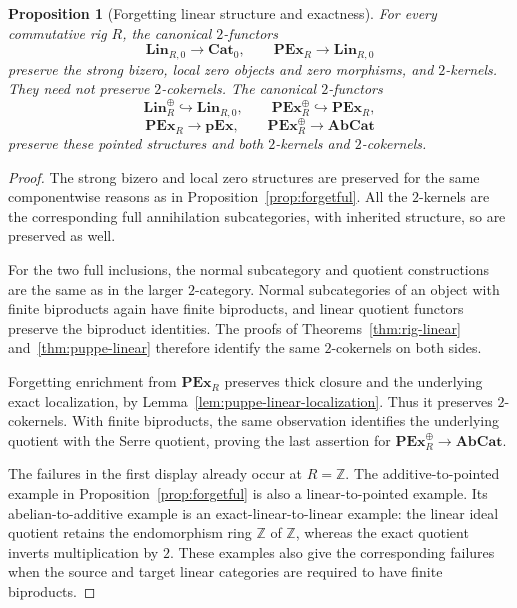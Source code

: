 \documentclass[11pt,reqno,a4paper]{amsart}
\newtheorem{proposition}[theorem]{Proposition}
\theoremstyle{definition}
\theoremstyle{remark}
\newcommand{\0}{\mathbf{0}}
\renewcommand{\1}{\mathbf{1}}
\newcommand{\AbCat}{\mathbf{AbCat}}
\newcommand{\pExact}{\mathbf{pEx}}
\newcommand{\Pt}{\mathbf{Cat}_{0}}
\begin{document}
\begin{proposition}[Forgetting linear structure and exactness]\label{prop:linear-forgetful}
For every commutative rig $R$, the canonical $2$-functors
\[
 \mathbf{Lin}_{R,0}\longrightarrow\Pt,
 \qquad
 \mathbf{PEx}_{R}\longrightarrow\mathbf{Lin}_{R,0}
\]
preserve the strong bizero, local zero objects and zero morphisms,
and $2$-kernels. They need not preserve $2$-cokernels.
The canonical $2$-functors
\[
 \mathbf{Lin}_{R}^{\oplus}\hookrightarrow\mathbf{Lin}_{R,0},
 \qquad
 \mathbf{PEx}_{R}^{\oplus}\hookrightarrow\mathbf{PEx}_{R},
\]
\[
 \mathbf{PEx}_{R}\longrightarrow\pExact,
 \qquad
 \mathbf{PEx}_{R}^{\oplus}\longrightarrow\AbCat
\]
preserve these pointed structures and both $2$-kernels and
$2$-cokernels.
\end{proposition}
\begin{proof}
The strong bizero and local zero structures are preserved for the
same componentwise reasons as in Proposition~\ref{prop:forgetful}.
All the $2$-kernels are the corresponding full annihilation
subcategories, with inherited structure, so are preserved as well.

For the two full inclusions, the normal subcategory and quotient
constructions are the same as in the larger $2$-category. Normal
subcategories of an object with finite biproducts again have finite
biproducts, and linear quotient functors preserve the biproduct
identities. The proofs of Theorems~\ref{thm:rig-linear}
and~\ref{thm:puppe-linear} therefore identify the same $2$-cokernels
on both sides.

Forgetting enrichment from $\mathbf{PEx}_{R}$ preserves thick
closure and the underlying exact localization, by
Lemma~\ref{lem:puppe-linear-localization}. Thus it preserves
$2$-cokernels. With finite biproducts, the same observation identifies
the underlying quotient with the Serre quotient, proving the last
assertion for $\mathbf{PEx}_{R}^{\oplus}\to\AbCat$.

The failures in the first display already occur at $R=\mathbb Z$.
The additive-to-pointed example in Proposition~\ref{prop:forgetful}
is also a linear-to-pointed example. Its abelian-to-additive example
is an exact-linear-to-linear example: the linear ideal quotient
retains the endomorphism ring $\mathbb Z$ of $\mathbb Z$, whereas
the exact quotient inverts multiplication by $2$. These examples
also give the corresponding failures when the source and target
linear categories are required to have finite biproducts.
\end{proof}
\end{document}
